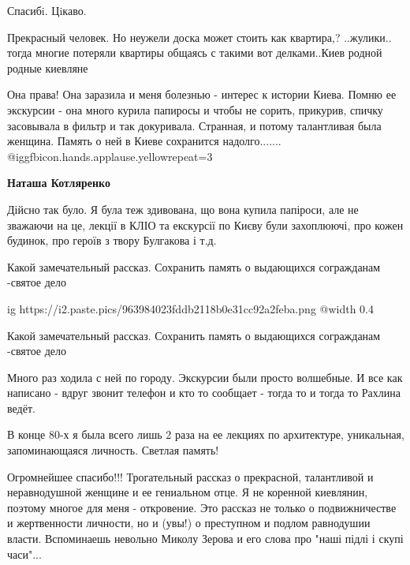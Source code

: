 \begin{itemize}
Спасибi. Цiкаво.


Прекрасный человек. Но неужели доска может стоить как квартира,? ..жулики..
тогда многие потеряли квартиры общаясь с такими вот делками..Киев родной родные
киевляне


Она права! Она заразила и меня болезнью - интерес к истории Киева. Помню ее
экскурсии - она много курила папиросы и чтобы не сорить, прикурив, спичку
засовывала в фильтр и так докуривала. Странная, и потому талантливая была
женщина. Память о ней в Киеве сохранится надолго....... @igg{fbicon.hands.applause.yellow}{repeat=3} 

\textbf{Наташа Котляренко} 

Дійсно так було. Я була теж здивована, що вона купила папіроси, але не зважаючи
на це, лекції в КЛІО та екскурсії по Києву були захоплюючі, про кожен будинок,
про героїв з твору Булгакова і т.д.




Какой замечательный рассказ. Сохранить память о выдающихся согражданам -святое
дело

\ifcmt
  ig https://i2.paste.pics/963984023fddb2118b0e31cc92a2feba.png
  @width 0.4
\fi

Какой замечательный рассказ. Сохранить память о выдающихся согражданам -святое дело


Много раз ходила с ней по городу. Экскурсии были просто волшебные. И все как
написано - вдруг звонит телефон и кто то сообщает - тогда то и тогда то Рахлина
ведёт.



В конце 80-х я была всего лишь 2 раза на ее лекциях по архитектуре, уникальная,
запоминающаяся личность. Светлая память!


Огромнейшее спасибо!!! Трогательный рассказ о прекрасной, талантливой и неравнодушной женщине и ее гениальном отце.
Я не коренной киевлянин, поэтому многое для меня - откровение.
Это рассказ не только о подвижничестве и жертвенности личности, но и (увы!) о преступном и подлом равнодушии власти.
Вспоминаешь невольно Миколу Зерова и его слова про "наші підлі і скупі часи"...


\end{itemize}
